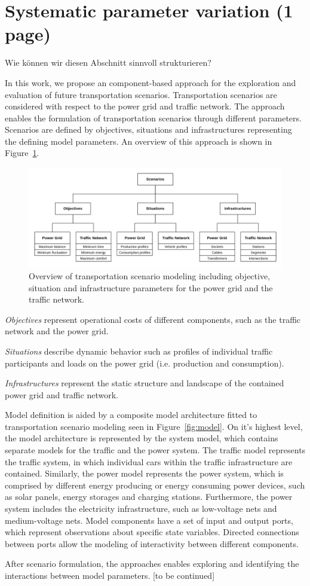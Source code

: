 \section{Systematic parameter variation (1 page)}
\label{section:contribution_2}

{\color{red} Wie k\"onnen wir diesen Abschnitt sinnvoll strukturieren?}

In this work, we propose an component-based approach for the exploration and evaluation of future transportation scenarios. Transportation scenarios are considered with respect to the power grid and traffic network. The approach enables the formulation of transportation scenarios through different parameters. Scenarios are defined by objectives, situations and infrastructures representing the defining model parameters. An overview of this approach is shown in Figure~\ref{fig:approach}. 

\begin{figure}[h]
	\centering
	\includegraphics[width=\columnwidth]{../gfx/approach.png}
	\caption{Overview of transportation scenario modeling including objective, situation and infrastructure parameters for the power grid and the traffic network.}
	\label{fig:approach}
\end{figure}

\textit{Objectives} represent operational costs of different components, such as the traffic network and the power grid. 

\textit{Situations}  describe dynamic behavior such as profiles of individual traffic participants and loads on the power grid (i.e. production and consumption).

\textit{Infrastructures} represent the static structure and landscape of the contained power grid and traffic network. 

Model definition is aided by a composite model architecture fitted to transportation scenario modeling seen in Figure~\ref{fig:model}. On it's highest level, the model architecture is represented by the system model, which contains separate models for the traffic and the power system. The traffic model represents the traffic system, in which individual cars within the traffic infrastructure are contained. Similarly, the power model represents the power system, which is comprised by different energy producing or energy consuming power devices, such as solar panels, energy storages and charging stations. Furthermore, the power system includes the electricity infrastructure, such as low-voltage nets and medium-voltage nets. Model components have a set of input and output ports, which represent observations about specific state variables. Directed connections between ports allow the modeling of interactivity between different components.

After scenario formulation, the approaches enables exploring and identifying the interactions between model parameters. [to be continued]
